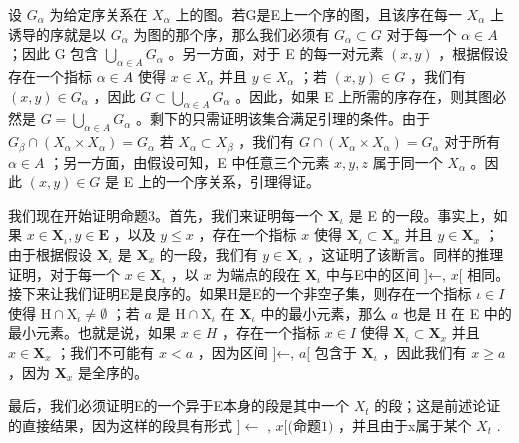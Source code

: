 设 \(G_{\alpha}\) 为给定序关系在 \(X_{\alpha}\) 上的图。若G是E上一个序的图，且该序在每一 \(X_{\alpha}\) 上诱导的序就是以 \(G_{\alpha}\) 为图的那个序，那么我们必须有 \(G_{\alpha} \subset G\) 对于每一个 \(\alpha \in A\) ；因此 G 包含 \(\bigcup_{\alpha \in A} G_{\alpha}\) 。另一方面，对于 E 的每一对元素 \((x, y)\) ，根据假设存在一个指标 \(\alpha \in A\) 使得 \(x \in X_{\alpha}\) 并且 \(y \in X_{\alpha}\) ；若 \((x, y) \in G\) ，我们有 \((x, y) \in G_{\alpha}\) ，因此 \(G \subset \bigcup_{\alpha \in A} G_{\alpha}\) 。因此，如果 E 上所需的序存在，则其图必然是 \(G = \bigcup_{\alpha \in A} G_{\alpha}\) 。剩下的只需证明该集合满足引理的条件。由于 \(G_{\beta} \cap (X_{\alpha} \times X_{\alpha}) = G_{\alpha}\) 若 \(X_{\alpha} \subset X_{\beta}\) ，我们有 \(G \cap (X_{\alpha} \times X_{\alpha}) = G_{\alpha}\) 对于所有 \(\alpha \in A\) ；另一方面，由假设可知，E 中任意三个元素 \(x, y, z\) 属于同一个 \(X_{\alpha}\) 。因此 \((x, y) \in G\) 是 E 上的一个序关系，引理得证。

我们现在开始证明命题3。首先，我们来证明每一个 \(\mathbf{X}_{\iota}\) 是 E 的一段。事实上，如果 \(x \in \mathbf{X}_{\iota}, y \in \mathbf{E}\) ，以及 \(y \leqslant x\) ，存在一个指标 \(x\) 使得 \(\mathbf{X}_{\iota} \subset \mathbf{X}_{x}\) 并且 \(y \in \mathbf{X}_{x}\) ；由于根据假设 \(\mathbf{X}_{\iota}\) 是 \(\mathbf{X}_{x}\) 的一段，我们有 \(y \in \mathbf{X}_{\iota}\) ，这证明了该断言。同样的推理证明，对于每一个 \(x \in \mathbf{X}_{\iota}\) ，以 \(x\) 为端点的段在 \(\mathbf{X}_{\iota}\) 中与E中的区间 {]}←, \(x[\) 相同。接下来让我们证明E是良序的。如果H是E的一个非空子集，则存在一个指标 \(\iota \in I\) 使得 \(\mathrm{H} \cap \mathrm{X}_{\iota} \neq \emptyset\) ；若 \(a\) 是 \(\mathrm{H} \cap \mathrm{X}_{\iota}\) 在 \(\mathbf{X}_{\iota}\) 中的最小元素，那么 \(a\) 也是 H 在 E 中的最小元素。也就是说，如果 \(x \in H\) ，存在一个指标 \(x \in I\) 使得 \(\mathbf{X}_{\iota} \subset \mathbf{X}_{x}\) 并且 \(x \in \mathbf{X}_{x}\) ；我们不可能有 \(x < a\) ，因为区间 {]}←, \(a[\) 包含于 \(\mathbf{X}_{\iota}\) ，因此我们有 \(x \geqslant a\) ，因为 \(\mathbf{X}_{x}\) 是全序的。

最后，我们必须证明E的一个异于E本身的段是其中一个 \(X_{t}\) 的段；这是前述论证的直接结果，因为这样的段具有形式 \(]\leftarrow\) , \(x[\text{(命题1)}\) ，并且由于x属于某个 \(X_{t}\) .

